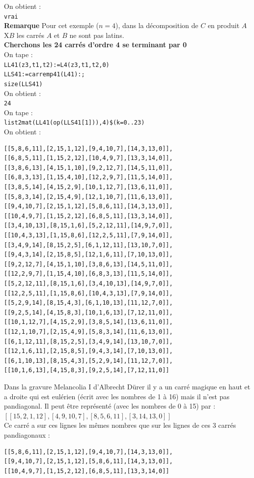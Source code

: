 \documentclass[a4paper,11pt]{book}
\begin{document}
On obtient :\\
{\tt vrai}\\
{\bf Remarque} Pour cet exemple ($n=4$), dans la d\'ecomposition de $C$ en 
produit $A$X$B$ les carr\'es $A$ et $B$ ne sont pas latins.\\
{\bf Cherchons les 24 carr\'es d'ordre 4 se terminant par 0}\\
On tape :\\
{\tt  LL41(z3,t1,t2):=L4(z3,t1,t2,0)}\\
{\tt LLS41:=carremp41(L41):;}\\
{\tt size(LLS41)} \\
On obtient :\\
{\tt 24} \\
On tape :\\
{\tt list2mat(LL41(op(LLS41[1])),4)\$(k=0..23)} \\
On obtient :\\
\begin{verbatim}
[[5,8,6,11],[2,15,1,12],[9,4,10,7],[14,3,13,0]],
[[6,8,5,11],[1,15,2,12],[10,4,9,7],[13,3,14,0]],
[[3,8,6,13],[4,15,1,10],[9,2,12,7],[14,5,11,0]],
[[6,8,3,13],[1,15,4,10],[12,2,9,7],[11,5,14,0]],
[[3,8,5,14],[4,15,2,9],[10,1,12,7],[13,6,11,0]],
[[5,8,3,14],[2,15,4,9],[12,1,10,7],[11,6,13,0]],
[[9,4,10,7],[2,15,1,12],[5,8,6,11],[14,3,13,0]],
[[10,4,9,7],[1,15,2,12],[6,8,5,11],[13,3,14,0]],
[[3,4,10,13],[8,15,1,6],[5,2,12,11],[14,9,7,0]],
[[10,4,3,13],[1,15,8,6],[12,2,5,11],[7,9,14,0]],
[[3,4,9,14],[8,15,2,5],[6,1,12,11],[13,10,7,0]],
[[9,4,3,14],[2,15,8,5],[12,1,6,11],[7,10,13,0]],
[[9,2,12,7],[4,15,1,10],[3,8,6,13],[14,5,11,0]],
[[12,2,9,7],[1,15,4,10],[6,8,3,13],[11,5,14,0]],
[[5,2,12,11],[8,15,1,6],[3,4,10,13],[14,9,7,0]],
[[12,2,5,11],[1,15,8,6],[10,4,3,13],[7,9,14,0]],
[[5,2,9,14],[8,15,4,3],[6,1,10,13],[11,12,7,0]],
[[9,2,5,14],[4,15,8,3],[10,1,6,13],[7,12,11,0]],
[[10,1,12,7],[4,15,2,9],[3,8,5,14],[13,6,11,0]],
[[12,1,10,7],[2,15,4,9],[5,8,3,14],[11,6,13,0]],
[[6,1,12,11],[8,15,2,5],[3,4,9,14],[13,10,7,0]],
[[12,1,6,11],[2,15,8,5],[9,4,3,14],[7,10,13,0]],
[[6,1,10,13],[8,15,4,3],[5,2,9,14],[11,12,7,0]],
[[10,1,6,13],[4,15,8,3],[9,2,5,14],[7,12,11,0]]
\end{verbatim}

Dans la gravure Melancolia I d'Albrecht Dürer il y a un carr\'e magique en 
haut et a droite qui est eul\'erien (\'ecrit avec les nombres de 1 \`a 16)
mais il n'est pas pandiagonal. Il peut \^etre repr\'esent\'e (avec les nombres 
de 0 \`a 15) par :\\
$[[15,2,1,12],[4,9,10,7],[8,5,6,11],[3,14,13,0]]$\\
Ce carr\'e a sur ces lignes les m\^emes nombres que sur les lignes de ces 3 
carr\'es pandiagonaux :\\
\begin{verbatim}
[[5,8,6,11],[2,15,1,12],[9,4,10,7],[14,3,13,0]],
[[9,4,10,7],[2,15,1,12],[5,8,6,11],[14,3,13,0]],
[[10,4,9,7],[1,15,2,12],[6,8,5,11],[13,3,14,0]]
\end{verbatim}
\end{document}
